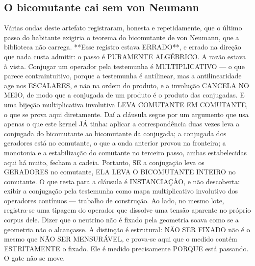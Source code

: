 \documentclass[11pt]{article}
\theoremstyle{definition}\newtheorem{deriv}{Derivação}
\begin{document}
\subsection*{O bicomutante cai sem von Neumann}V\'arias ondas deste artefato registraram, honesta e repetidamente, que o \'ultimo passo do habitante exigiria o teorema do bicomutante de von Neumann, que a biblioteca n\~ao carrega. **Esse registro estava ERRADO**, e errado na dire\c{c}\~ao que nada custa admitir: o passo \'e PURAMENTE ALG\'EBRICO. A raz\~ao estava \`a vista. Conjugar um operador pela testemunha \'e MULTIPLICATIVO --- o que parece contraintuitivo, porque a testemunha \'e antilinear, mas a antilinearidade age nos ESCALARES, e n\~ao na ordem do produto, e a involu\c{c}\~ao CANCELA NO MEIO, de modo que a conjugada de um produto \'e o produto das conjugadas. E uma bije\c{c}\~ao multiplicativa involutiva LEVA COMUTANTE EM COMUTANTE, o que se prova aqui diretamente. Da\'i a cl\'ausula segue por um argumento que usa apenas o que este kernel J\'A tinha: aplicar a correspond\^encia duas vezes leva a conjugada do bicomutante ao bicomutante da conjugada; a conjugada dos geradores est\'a no comutante, o que a onda anterior provou na fronteira; a monotonia e a estabiliza\c{c}\~ao do comutante no terceiro passo, ambas estabelecidas aqui h\'a muito, fecham a cadeia. Portanto, SE a conjuga\c{c}\~ao leva os GERADORES no comutante, ELA LEVA O BICOMUTANTE INTEIRO no comutante. O que resta para a cl\'ausula \'e INSTANCIA\c{C}\~AO, e n\~ao descoberta: exibir a conjuga\c{c}\~ao pela testemunha como mapa multiplicativo involutivo dos operadores cont\'inuos --- trabalho de constru\c{c}\~ao. Ao lado, no mesmo lote, registra-se uma tipagem do operador que dissolve uma tens\~ao aparente no pr\'oprio corpus dele. Dizer que o neutrino n\~ao \'e fixado pela geometria soava como se a geometria n\~ao o alcan\c{c}asse. A distin\c{c}\~ao \'e estrutural: N\~AO SER FIXADO n\~ao \'e o mesmo que N\~AO SER MENSUR\'AVEL, e prova-se aqui que o medido cont\'em ESTRITAMENTE o fixado. Ele \'e medido precisamente PORQUE est\'a passando. O gate n\~ao se move.
\end{document}
